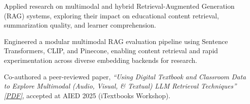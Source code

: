 \documentclass[letterpaper,11pt]{article}
\newcommand{\resumeItem}[1]{
  \item{\small{#1}}
  \vspace{-1.5px}
}
\begin{document}
\resumeItem{Applied research on multimodal and hybrid Retrieval-Augmented Generation (RAG) systems, exploring their impact on educational content retrieval, summarization quality, and learner comprehension.}

\resumeItem{Engineered a modular multimodal RAG evaluation pipeline using Sentence Transformers, CLIP, and Pinecone, enabling content retrieval and rapid experimentation across diverse embedding backends for research.}


\resumeItem{Co-authored a peer-reviewed paper, \textit{“Using Digital Textbook and Classroom Data to Explore Multimodal (Audio, Visual, \& Textual) LLM Retrieval Techniques”} \href{https://intextbooks.science.uu.nl/workshop2025/files/iTextbooks2025_paper_3.pdf}{\textit{[PDF]}}, accepted at AIED 2025 (iTextbooks Workshop).}





\end{document}

